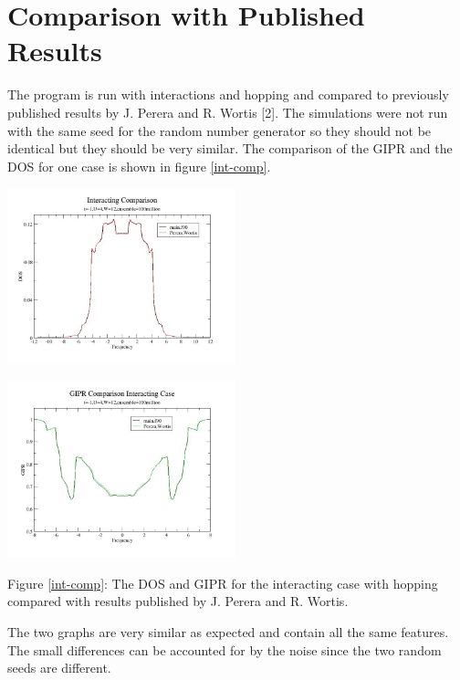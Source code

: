 \documentclass{article}
\begin{document}
\section{Comparison with Published Results}
The program is run with interactions and hopping and compared to previously published results by J. Perera and R. Wortis [2]. The simulations were not run with the same seed for the random number generator so they should not be identical but they should be very similar. The comparison of the GIPR and the DOS for one case is shown in figure \ref{int-comp}.
\begin{multicols}{2} \label{int-comp}
\begin{center}
	\includegraphics[width=250px]{dos_compareu4.jpg} \\
\end{center}
\begin{center}
	\includegraphics[width=250px]{gipr_compareu4.jpg} \\
\end{center}
\end{multicols}
\begin{center}
Figure \ref{int-comp}: The DOS and GIPR for the interacting case with hopping compared with results published by J. Perera and R. Wortis.
\end{center}
The two graphs are very similar as expected and contain all the same features. The small differences can be accounted for by the noise since the two random seeds are different.
\end{document}
